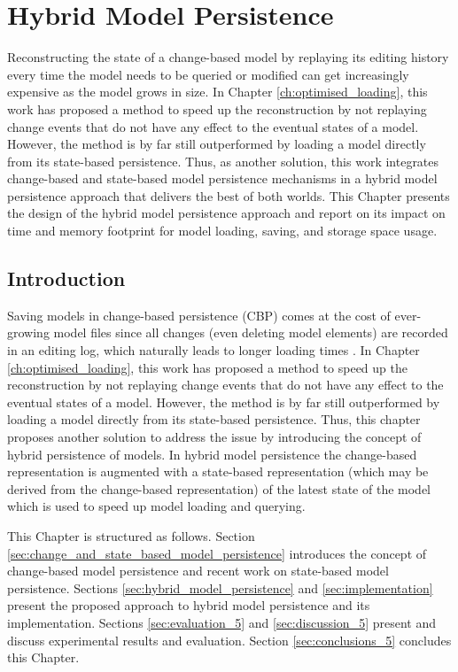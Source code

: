 \chapter{Hybrid Model Persistence}
\label{ch:hybrid_model_persistence}

Reconstructing the state of a change-based model by replaying its editing history every time the model needs to be queried or modified can get increasingly expensive as the model grows in size. In Chapter \ref{ch:optimised_loading}, this work has proposed a method to speed up the reconstruction by not replaying change events that do not have any effect to the eventual states of a model. However, the method is by far still outperformed by loading a model directly from its state-based persistence. Thus, as another solution, this work integrates change-based and state-based model persistence mechanisms in a hybrid model persistence approach that delivers the best of both worlds. This Chapter presents the design of the hybrid model persistence approach and report on its impact on time and memory footprint for model loading, saving, and storage space usage.

\section{Introduction}
\label{sec:introduction_5}
Saving models in change-based persistence (CBP) comes at the cost of ever-growing model files \cite{DBLP:conf/edoc/KoegelHLHD10,DBLP:journals/entcs/RobbesL07} since all changes (even deleting model elements) are recorded in an editing log, which naturally leads to longer loading times \cite{mens2002state}. 
In Chapter \ref{ch:optimised_loading}, this work has proposed a method to speed up the reconstruction by not replaying change events that do not have any effect to the eventual states of a model. However, the method is by far still outperformed by loading a model directly from its state-based persistence.
Thus, this chapter proposes another solution to address the issue by introducing the concept of hybrid persistence of models. In hybrid model persistence the change-based representation is augmented with a state-based representation (which may be derived from the change-based representation) of the latest state of the model which is used to speed up model loading and querying.

This Chapter is structured as follows. Section \ref{sec:change_and_state_based_model_persistence} introduces the concept of change-based model persistence and recent work on state-based model persistence. Sections \ref{sec:hybrid_model_persistence} and \ref{sec:implementation} present the proposed approach to hybrid model persistence and its implementation. Sections \ref{sec:evaluation_5} and \ref{sec:discussion_5} present and discuss experimental results and evaluation. Section \ref{sec:conclusions_5} concludes this Chapter.

